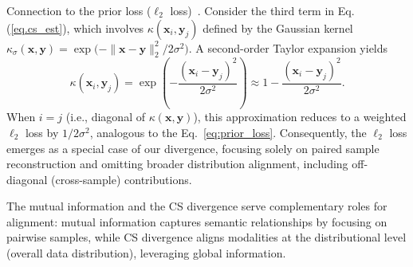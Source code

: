 \begin{remark} Connection to the prior loss ($\ell_2$ loss)~\citep{patel2024eclipse}.
    Consider the third term in Eq. (\ref{eq.cs_est}), which involves $\kappa(\mathbf{x}_i,\mathbf{y}_j)$ defined by the Gaussian kernel $\kappa_{\sigma}(\mathbf{x},\mathbf{y})=\exp\!\bigl(-\|\mathbf{x}-\mathbf{y}\|_2^2/2\sigma^2\bigr)$. A second-order Taylor expansion yields
    \begin{equation}
        \kappa(\mathbf{x}_i, \mathbf{y}_j) = \exp\left(-\frac{(\mathbf{x}_i - \mathbf{y}_j)^2}{2\sigma^2}\right) \approx 1 - \frac{(\mathbf{x}_i - \mathbf{y}_j)^2}{2\sigma^2}.
    \end{equation}
    When \(i = j\) (i.e., diagonal of \(\kappa(\mathbf{x},\mathbf{y})\)), this approximation reduces to a weighted \(\ell_2\) loss by \(1/2\sigma^2\), analogous to the Eq.~\ref{eq:prior_loss}. Consequently, the \(\ell_2\) loss emerges as a special case of our divergence, focusing solely on paired sample reconstruction and omitting broader distribution alignment, including off-diagonal (cross-sample) contributions.
\end{remark}



The mutual information and the CS divergence serve complementary roles for alignment: mutual information captures semantic relationships by focusing on pairwise samples, while CS divergence aligns modalities at the distributional level (overall data distribution), leveraging global information.


